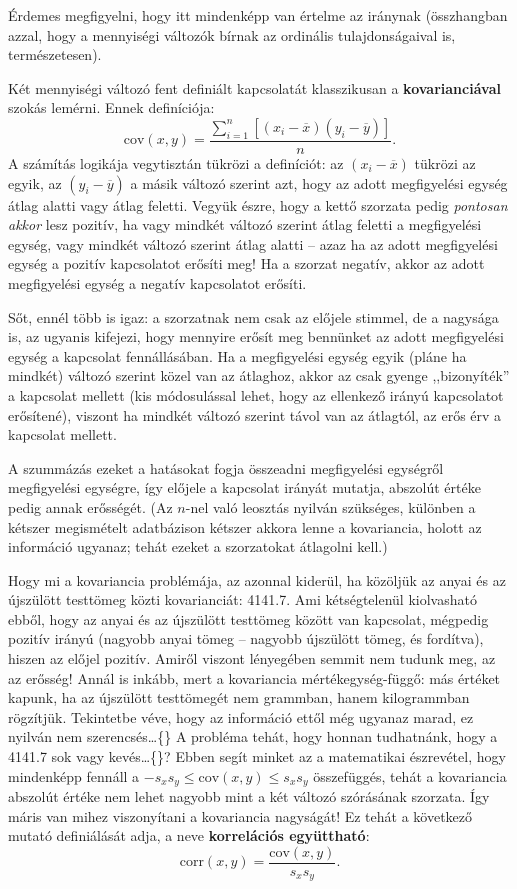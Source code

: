 \documentclass[
]{book}
\begin{document}
Érdemes megfigyelni, hogy itt mindenképp van értelme az iránynak (összhangban azzal, hogy a mennyiségi változók bírnak az ordinális tulajdonságaival is, természetesen).

Két mennyiségi változó fent definiált kapcsolatát klasszikusan a \textbf{kovarianciával} szokás lemérni. Ennek definíciója:
\[
    \mathrm{cov}\left(x,y\right)=\frac{\sum_{i=1}^n \left[\left(x_i-\overline{x}\right)\left(y_i-\overline{y}\right)\right]}{n}.
\]
A számítás logikája vegytisztán tükrözi a definíciót: az \(\left(x_i-\overline{x}\right)\) tükrözi az egyik, az \(\left(y_i-\overline{y}\right)\) a másik változó szerint azt, hogy az adott megfigyelési egység átlag alatti vagy átlag feletti. Vegyük észre, hogy a kettő szorzata pedig \emph{pontosan akkor} lesz pozitív, ha vagy mindkét változó szerint átlag feletti a megfigyelési egység, vagy mindkét változó szerint átlag alatti -- azaz ha az adott megfigyelési egység a pozitív kapcsolatot erősíti meg! Ha a szorzat negatív, akkor az adott megfigyelési egység a negatív kapcsolatot erősíti.

Sőt, ennél több is igaz: a szorzatnak nem csak az előjele stimmel, de a nagysága is, az ugyanis kifejezi, hogy mennyire erősít meg bennünket az adott megfigyelési egység a kapcsolat fennállásában. Ha a megfigyelési egység egyik (pláne ha mindkét) változó szerint közel van az átlaghoz, akkor az csak gyenge ,,bizonyíték'' a kapcsolat mellett (kis módosulással lehet, hogy az ellenkező irányú kapcsolatot erősítené), viszont ha mindkét változó szerint távol van az átlagtól, az erős érv a kapcsolat mellett.

A szummázás ezeket a hatásokat fogja összeadni megfigyelési egységről megfigyelési egységre, így előjele a kapcsolat irányát mutatja, abszolút értéke pedig annak erősségét. (Az \(n\)-nel való leosztás nyilván szükséges, különben a kétszer megismételt adatbázison kétszer akkora lenne a kovariancia, holott az információ ugyanaz; tehát ezeket a szorzatokat átlagolni kell.)

Hogy mi a kovariancia problémája, az azonnal kiderül, ha közöljük az anyai és az újszülött testtömeg közti kovarianciát: 4141.7. Ami kétségtelenül kiolvasható ebből, hogy az anyai és az újszülött testtömeg között van kapcsolat, mégpedig pozitív irányú (nagyobb anyai tömeg -- nagyobb újszülött tömeg, és fordítva), hiszen az előjel pozitív. Amiről viszont lényegében semmit nem tudunk meg, az az erősség! Annál is inkább, mert a kovariancia mértékegység-függő: más értéket kapunk, ha az újszülött testtömegét nem grammban, hanem kilogrammban rögzítjük. Tekintetbe véve, hogy az információ ettől még ugyanaz marad, ez nyilván nem szerencsés\dots\{\} A probléma tehát, hogy honnan tudhatnánk, hogy a 4141.7 sok vagy kevés\dots\{\}? Ebben segít minket az a matematikai észrevétel, hogy mindenképp fennáll a \(-s_x s_y \leq \mathrm{cov}\left(x,y\right) \leq s_x s_y\) összefüggés, tehát a kovariancia abszolút értéke nem lehet nagyobb mint a két változó szórásának szorzata. Így máris van mihez viszonyítani a kovariancia nagyságát! Ez tehát a következő mutató definiálását adja, a neve \textbf{korrelációs együttható}:
\[
    \mathrm{corr}\left(x,y\right)=\frac{\mathrm{cov}\left(x,y\right)}{s_x s_y}.
\]
\end{document}
